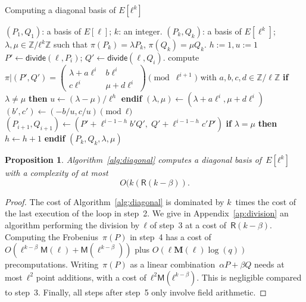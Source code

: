 \documentclass{lms}
\newtheorem{prop}[thm]{Proposition}
\begin{document}
\begin{algorithm}
\caption{\label{alg:diagonal}Computing a diagonal basis of $E[ℓ^k]$}
\begin{algorithmic}[1]
\REQUIRE $(P_1, Q_1 )$: a basis of $E[\ell]$;
$k$: an integer.
\ENSURE $(P_k, Q_k )$: a basis of $E[\ell^k]$;
$λ, μ ∈ ℤ/ℓ^k ℤ$
such that $\pi(P_k)= λ P_k$, $ \pi(Q_k)= μ Q_k$.
\STATE $h:=1, u:=1$
\STATE $P' \leftarrow \mathsf{divide}(\ell, P_i)$; $Q' \leftarrow \mathsf{divide}(\ell, Q_i)$.
\STATE compute $\pi|(P',Q')=\left( \begin{array}{cc}
λ + a\ell^{i} & b\ell^{i}\\
c\ell^{i} & μ + d\ell^{i}
\end{array} \right) \pmod {\ell^{i+1}}$
with $a,b,c,d \in \mathbb{Z}/\ell\mathbb{Z}$
\STATE \textbf{if} {$λ \neq μ$} \textbf{then}
$u \leftarrow (λ -μ)/\ell^h$ \textbf{endif}
\STATE $(λ, μ) \gets
  (λ + a\ell^i, μ + d\ell^i)$
\STATE $(b',c') \gets (-b/u , c/u) \pmod{ℓ}$
\STATE $(P_{i+1},Q_{i+1}) \gets
  (P'+\ell^{i-1-h}b' Q',\;Q'+\ell^{i-1-h}c' P')$
\STATE \textbf{if} {$λ = μ$} \textbf{then} $h \leftarrow h+1$ \textbf{endif}
\ENDFOR
\RETURN $(P_{k},Q_{k},λ,μ)$
\end{algorithmic}
\end{algorithm}
\begin{prop}
Algorithm~\ref{alg:diagonal} computes a diagonal basis of~$E[ℓ^k]$
with a complexity of at most \vskip -20pt
\begin{equation*}
O(k(\mathsf{R}(k-\beta)).
\end{equation*}

\end{prop}
\begin{proof}
The cost of Algorithm~\ref{alg:diagonal} is dominated
by $k$~times the cost of the last execution of the loop in step~2.
We give in Appendix~\ref{ap:division} an algorithm
performing the division by~$ℓ$ of step~3 at a cost of~$\mathsf R(k-\beta)$.
Computing the Frobenius~$π(P)$ in step~4 has a cost of~$O(\ell^{k-\beta}\mathsf{M}(\ell)+\mathsf{M}(\ell^{k-\beta}))$ plus $O(\ell \mathbf{M}(\ell) \log(q))$ precomputations.
Writing~$π(P)$ as a linear combination~$α P + β Q$
needs at most~$ℓ^2$ point additions, with a cost of~$ℓ^2 \mathsf{M}(ℓ^{k-\beta})$.
This is %
negligible compared to step~3.
Finally, all steps after step~5 only involve field arithmetic.
\end{proof}
\end{document}
